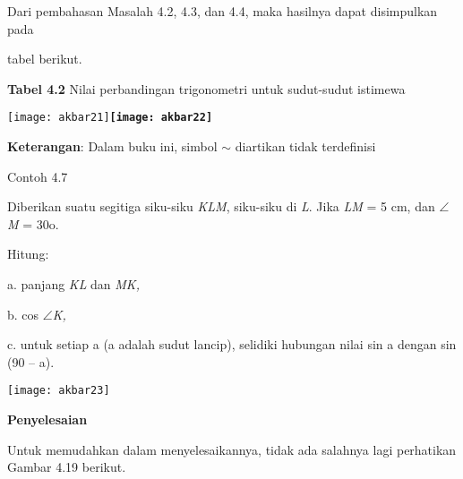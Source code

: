 \documentclass[11pt,fleqn]{book} %
\begin{document}
\begin{myEnumerate}
\begin{itemize}
\noindent 

\noindent 

\noindent Dari pembahasan Masalah 4.2, 4.3, dan 4.4, maka hasilnya dapat disimpulkan pada

\noindent tabel berikut.

\noindent \textbf{Tabel 4.2 }Nilai perbandingan trigonometri untuk sudut-sudut istimewa

\noindent 

\noindent \texttt{[image: akbar21]}\textbf{\texttt{[image: akbar22]}}

\noindent \textbf{}

\noindent \textbf{}

\noindent \textbf{}

\noindent \textbf{}

\noindent \textbf{}

\noindent \textbf{}

\noindent \textbf{}

\noindent \textbf{Keterangan}: Dalam buku ini, simbol $\sim$ diartikan tidak terdefinisi

\noindent 

\noindent Contoh 4.7

\noindent Diberikan suatu segitiga siku-siku \textit{KLM}, siku-siku di \textit{L}. Jika \textit{LM }= 5 cm, dan $\mathrm{\angle }$\textit{M }= 30o.

\noindent 

\noindent Hitung:

\noindent a. panjang \textit{KL }dan \textit{MK,}

\noindent b. cos $\mathrm{\angle }$\textit{K,}

\noindent c. untuk setiap a (a adalah sudut lancip), selidiki hubungan nilai sin a dengan sin (90 -- a).

\noindent 

\noindent 

\noindent 

\noindent 

\noindent 

\noindent \texttt{[image: akbar23]}

\noindent \textbf{}

\noindent \textbf{Penyelesaian}

\noindent 

\noindent Untuk memudahkan dalam menyelesaikannya, tidak ada salahnya lagi perhatikan Gambar 4.19 berikut.


\end{itemize}
\end{myEnumerate}
\end{document}
